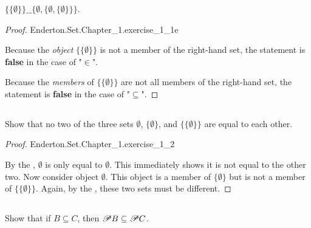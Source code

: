 \documentclass{report}
\begin{document}
\subsubsection{}%

$\{\{\emptyset\}\} \_\_ \{\emptyset, \{\emptyset, \{\emptyset\}\}\}$.

\begin{proof}

    {Enderton.Set.Chapter\_1.exercise\_1\_1e}

  Because the \textit{object} $\{\{\emptyset\}\}$ is not a member of the
    right-hand set, the statement is \textbf{false} in the case of "$\in$".

  Because the \textit{members} of $\{\{\emptyset\}\}$ are not all members of the
    right-hand set, the statement is \textbf{false} in the case of
    "$\subseteq$".

\end{proof}

\subsection{}%

Show that no two of the three sets $\emptyset$, $\{\emptyset\}$, and
  $\{\{\emptyset\}\}$ are equal to each other.

\begin{proof}

    {Enderton.Set.Chapter\_1.exercise\_1\_2}

  By the , $\emptyset$ is only equal to
    $\emptyset$.
  This immediately shows it is not equal to the other two.
  Now consider object $\emptyset$.
  This object is a member of $\{\emptyset\}$ but is not a member of
    $\{\{\emptyset\}\}$.
  Again, by the , these two sets must be
    different.

\end{proof}

\subsection{}%

Show that if $B \subseteq C$, then $\mathscr{P}B \subseteq \mathscr{P}C$.
\end{document}
